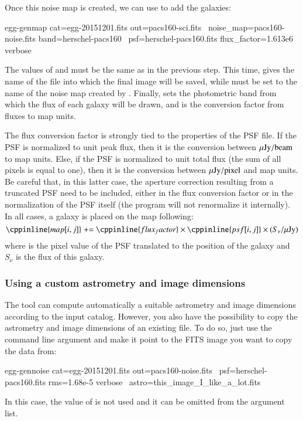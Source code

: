 Once this noise map is created, we can use  to add the galaxies:
\begin{bashcode}
egg-genmap cat=egg-20151201.fits out=pacs160-sci.fits \
    noise_map=pacs160-noise.fits band=herschel-pacs160 \
    psf=herschel-pacs160.fits flux_factor=1.613e6 verbose
\end{bashcode}
The values of \bashinline{cat} and \bashinline{psf} must be the same as in the previous step. This time,  gives the name of the file into which the final image will be saved, while  must be set to the name of the noise map created by . Finally,  sets the photometric band from which the flux of each galaxy will be drawn, and  is the conversion factor from fluxes to map units.

The flux conversion factor is strongly tied to the properties of the PSF file. If the PSF is normalized to unit peak flux, then it is the conversion between $\mu{\rm Jy}/{\rm beam}$ to map units. Else, if the PSF is normalized to unit total flux (the sum of all pixels is equal to one), then it is the conversion between $\mu{\rm Jy}/{\rm pixel}$ and map units. Be careful that, in this latter case, the aperture correction resulting from a truncated PSF need to be included, either in the flux conversion factor or in the normalization of the PSF itself (the program will not renormalize it internally). In all cases, a galaxy is placed on the map following:
\begin{equation}
\cppinline{map[i,j]} \mathrel{+}= \cppinline{flux_factor} \times {} \times (S_{\nu}/\uJy) \nonumber
\end{equation}
where \cppinline{psf[i,j]} is the pixel value of the PSF translated to the position of the galaxy and $S_{\nu}$ is the flux of this galaxy.


\subsubsection{Using a custom astrometry and image dimensions}

The tool  can compute automatically a suitable astrometry and image dimensions according to the input catalog. However, you also have the possibility to copy the astrometry and image dimensions of an existing file. To do so, just use the  command line argument and make it point to the FITS image you want to copy the data from:
\begin{bashcode}
egg-gennoise cat=egg-20151201.fits out=pacs160-noise.fits \
    psf=herschel-pacs160.fits rms=1.68e-5 verbose \
    astro=this_image_I_like_a_lot.fits
\end{bashcode}
In this case, the value of \bashinline{aspix} is not used and it can be omitted from the argument list.


